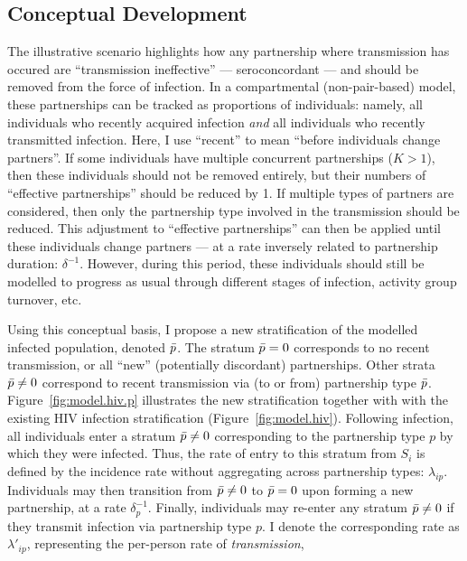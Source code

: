 \subsection{Conceptual Development}\label{foi.prop.concept}
The illustrative scenario highlights how any partnership where transmission has occured
are ``transmission ineffective'' --- \ie seroconcordant ---
and should be removed from the force of infection.
In a compartmental (non-pair-based) model,
these partnerships can be tracked as proportions of individuals: namely,
all individuals who recently acquired infection \emph{and}
all individuals who recently transmitted infection.
Here, I use ``recent'' to mean ``before individuals change partners''.
If some individuals have multiple concurrent partnerships ($K > 1$),
then these individuals should not be removed entirely,
but their numbers of ``effective partnerships'' should be reduced by 1.
If multiple types of partners are considered,
then only the partnership type involved in the transmission should be reduced.
This adjustment to ``effective partnerships'' can then be applied
until these individuals change partners
--- at a rate inversely related to partnership duration: $\delta^{-1}$.
However, during this period, these individuals should still be modelled
to progress as usual through different stages of infection, activity group turnover, etc.
\par
Using this conceptual basis,
I propose a new stratification of the modelled infected population, denoted $\bar{p}$.
The stratum $\bar{p} = 0$ corresponds to no recent transmission,
or all ``new'' (potentially discordant) partnerships.
Other strata $\bar{p} \ne 0$ correspond to recent transmission via (to or from) partnership type $\bar{p}$.
Figure~\ref{fig:model.hiv.p} illustrates the new stratification
together with with the existing HIV infection stratification (Figure~\ref{fig:model.hiv}).
Following infection, all individuals enter a stratum $\bar{p} \ne 0$
corresponding to the partnership type $p$ by which they were infected.
Thus, the rate of entry to this stratum from $S_i$ is defined by
the incidence rate without aggregating across partnership types: $\lambda_{ip}$.
Individuals may then transition from $\bar{p} \ne 0$ to $\bar{p} = 0$
upon forming a new partnership, at a rate $\delta_p^{-1}$.
Finally, individuals may re-enter any stratum $\bar{p} \ne 0$
if they transmit infection via partnership type $p$.
I denote the corresponding rate as $\lambda'_{ip}$,
representing the per-person rate of \emph{transmission},
